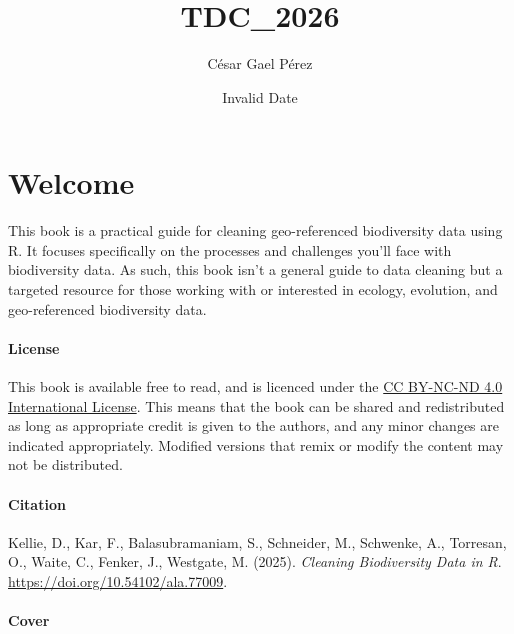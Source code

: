 \documentclass[
  letterpaper,
  DIV=11,
  numbers=noendperiod]{scrreprt}
\title{TDC\_2026}
\author{César Gael Pérez}
\date{Invalid Date}
\renewcommand*\contentsname{Table of contents}
\newcommand\contentsname{Table of contents}
\begin{document}
\maketitle

\renewcommand*\contentsname{Table of contents}
{
\setcounter{tocdepth}{2}
\tableofcontents
}


\chapter*{Welcome}\label{welcome}


This book is a practical guide for cleaning geo-referenced biodiversity
data using R. It focuses specifically on the processes and challenges
you'll face with biodiversity data. As such, this book isn't a general
guide to data cleaning but a targeted resource for those working with or
interested in ecology, evolution, and geo-referenced biodiversity data.

\subsubsection*{License}\label{license}

This book is available free to read, and is licenced under the
\href{https://creativecommons.org/licenses/by-nc-sa/4.0/}{CC BY-NC-ND
4.0 International License}. This means that the book can be shared and
redistributed as long as appropriate credit is given to the authors, and
any minor changes are indicated appropriately. Modified versions that
remix or modify the content may not be distributed.

\subsubsection*{Citation}\label{citation}

Kellie, D., Kar, F., Balasubramaniam, S., Schneider, M., Schwenke, A.,
Torresan, O., Waite, C., Fenker, J., Westgate, M. (2025). \emph{Cleaning
Biodiversity Data in R}. \url{https://doi.org/10.54102/ala.77009}.

\subsubsection*{Cover}\label{cover}
\end{document}
